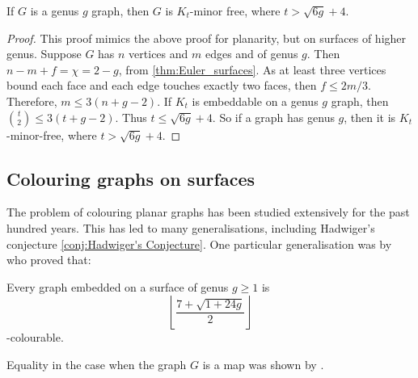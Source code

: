 \begin{theorem}\label{thm:bounded_genus_kt_free}
	If \(G\) is a genus \(g\) graph, then \(G\) is \(K_t\)-minor free, where \(t > \sqrt{6g} + 4\). 
\end{theorem}
\begin{proof}
	This proof mimics the above proof for planarity, but on surfaces of higher genus. 
	Suppose \(G\) has \(n\) vertices and \(m\) edges and of genus $g$. Then \(n - m + f = \chi = 2-g\), from \cref{thm:Euler_surfaces}. As at least three vertices bound each face and each edge touches exactly two faces, then \(f \leq 2m/3\). Therefore, \(m \leq 3(n + g - 2)\). If \(K_t\) is embeddable on a genus \(g\) graph, then \(\binom{t}{2} \leq 3 (t + g - 2)\). Thus \(t \leq \sqrt{6g} + 4\). So if a graph has genus \(g\), then it is \(K_t\)-minor-free, where \(t > \sqrt{6g} + 4\). 
\end{proof}

\subsection{Colouring graphs on surfaces}
The problem of colouring planar graphs has been studied extensively for the past hundred years. This has led to many generalisations, including Hadwiger's conjecture \cref{conj:Hadwiger's Conjecture}. One particular generalisation was by \textcite{heawoodMapcolourTheorem1890} who proved that:

\begin{theorem}
	Every graph embedded on a surface of genus $g \geq 1$ is
	\begin{equation*}
		\left\lfloor 
		\frac{7 + \sqrt{1 + 24g}}{2}
		\right\rfloor
	\end{equation*}
	-colourable. 
\end{theorem}

Equality in the case when the graph $G$ is a map was shown by \textcite{ringelMapColorTheorem1974}.

